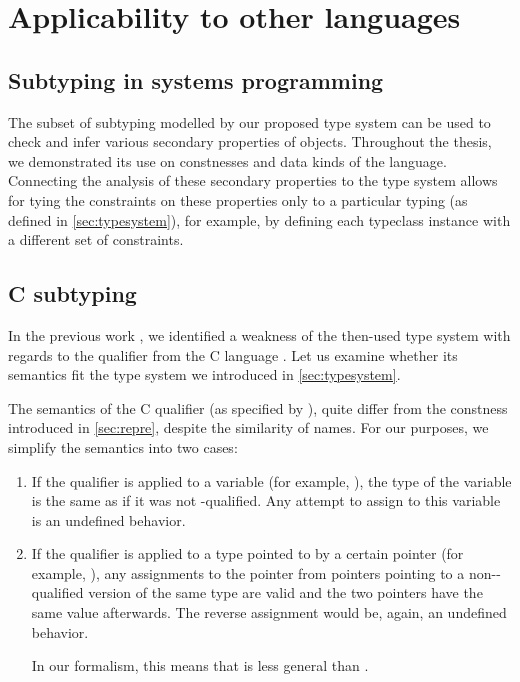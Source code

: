 \section{Applicability to other languages}

\subsection{Subtyping in systems programming}

The subset of subtyping modelled by our proposed type system can be used to check and infer various secondary properties of objects. Throughout the thesis, we demonstrated its use on constnesses and data kinds of the \cmm language. Connecting the analysis of these secondary properties to the type system allows for tying the constraints on these properties only to a particular typing (as defined in \cref{sec:typesystem}), for example, by defining each typeclass instance with a different set of constraints.

\subsection{C subtyping}

In the previous work \cite{klepl2020type}, we identified a weakness of the then-used type system with regards to the  qualifier from the C language \cite{cstandard2018}. Let us examine whether its semantics fit the type system we introduced in \cref{sec:typesystem}.

The semantics of the C  qualifier (as specified by \cite{cstandard2018}), quite differ from the constness introduced in \cref{sec:repre}, despite the similarity of names. For our purposes, we simplify the semantics into two cases:

\begin{enumerate}
    \item If the  qualifier is applied to a variable (for example, ), the type of the variable is the same as if it was not -qualified. Any attempt to assign to this variable is an undefined behavior. \label{constvar}

    \item If the  qualifier is applied to a type pointed to by a certain pointer (for example, ), any assignments to the pointer from pointers pointing to a non--qualified version of the same type are valid and the two pointers have the same value afterwards. The reverse assignment would be, again, an undefined behavior. \label{pointerSubtype}

    In our formalism, this means that  is less general than .
\end{enumerate}

